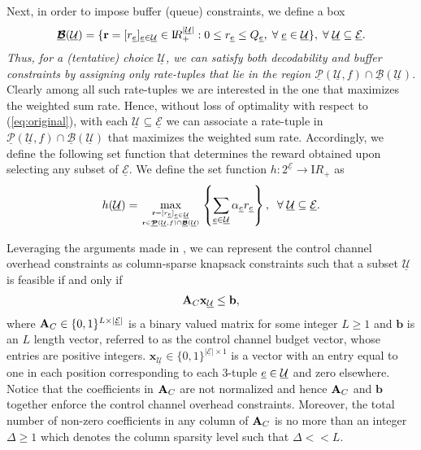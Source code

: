 \documentclass[11pt] {article}
\newcommand{\Reals}     {{{\mathrm I\!R}}}  \newcommand{\Cplx}      {{{\mathsf I}\!\!\!{\mathrm C}}} \newcommand{\NCplx}     {{{\mathcal{CN}}}} \newcommand{\Ints}      {{{\mathbb Z}}} \newcommand{\Rats}      {{{\mathsf I}\!\!\!{\mathrm Q}}}    \newcommand{\Nats}      {{{\mathrm{ I\!N}}}} \newcommand{\Tee}{      {{\mathbb T}}}
\newcommand{\uwti}[1]{{\mathbf #1}}
\newcommand{\bb}{{\uwti b}}  \newcommand{\Bb}{{\uwti B}}
\newcommand{\rb}{{\uwti r}}  \newcommand{\Rb}{{\uwti R}}
\newcommand{\xb}{{\uwti x}}  \newcommand{\Xb}{{\uwti X}}
\newcommand{\Pulk} {{\underline{{\bm {\mathcal P}}}}}
\newcommand{\Bulk} {{\underline{{\bm {\mathcal B}}}}}
\newcommand{\Uulc} {{\underline{\mathcal U}}}
\newcommand{\Eulc} {{\underline{\mathcal E}}}
\begin{document}
Next, in order to impose buffer (queue) constraints, we define a box
 \begin{eqnarray}
  \Bulk(\Uulc)=\{\rb=[r_{\eul}]_{\eul\in\Uulc}\in\Reals_+^{|\Uulc|}: 0\leq r_{\eul}\leq Q_{\eul},\;\forall\;\eul\in\Uulc \},\;\forall\; \Uulc\subseteq\Eulc.
 \end{eqnarray}
{\em Thus, for a (tentative) choice $\Uulc$, we can satisfy both decodability and buffer constraints by assigning only rate-tuples that lie in the region  $ \Pulk(\Uulc,f)\cap \Bulk(\Uulc)$}.
Clearly among all such rate-tuples we are interested in the one that maximizes the weighted sum rate. Hence, without loss of optimality with respect to (\ref{eq:original}), with each $\Uulc\subseteq\Eulc$ we can associate a rate-tuple in $ \Pulk(\Uulc,f)\cap \Bulk(\Uulc)$ that maximizes the weighted sum rate. Accordingly, we define the following set function that determines the reward obtained upon selecting any subset of  $\Eulc$.
We define the set function $h:2^{\Eulc}\to \Reals_+$ as
 \begin{eqnarray}\label{eq:defnh}
  h(\Uulc) = \max_{\rb=[r_{\eul}]_{\eul\in\Uulc}\atop \rb\in \Pulk(\Uulc,f)\cap \Bulk(\Uulc)}  \left\{\sum_{\eul\in\Uulc}\alpha_{\eul}r_{\eul}\right\},\;\;\forall\;\Uulc\subseteq\Eulc.
 \end{eqnarray}




  Leveraging  the arguments made in  \cite{prasad:wiopt12}, we can  represent the control channel overhead constraints as column-sparse knapsack constraints
 such that a subset $\Uulc$ is feasible if and only if
 \begin{eqnarray}
 \Ab_C\xb_{\Uulc}\leq {\bf \bb},
 \end{eqnarray}
 where $\Ab_C\in \{0,1\}^{L\times |\Eulc|}$ is a binary valued matrix for some integer $L\geq 1$ and $ \bb$ is an $L$ length vector, referred to as the control channel budget vector,  whose entries are positive integers. $\xb_{\Uulc}\in\{0,1\}^{|\Eulc|\times 1}$ is a vector with an entry equal to one in each position corresponding to each 3-tuple $\eul\in\Uulc$ and zero elsewhere.
 Notice that the coefficients in $\Ab_C$ are not normalized and hence $\Ab_C$ and $\bb$ together enforce the control channel overhead constraints. Moreover, the total number of non-zero coefficients in any column of $\Ab_C$ is no more than  an integer $\Delta\geq 1$ which denotes the column sparsity level such that $\Delta<<L$.
\end{document}

